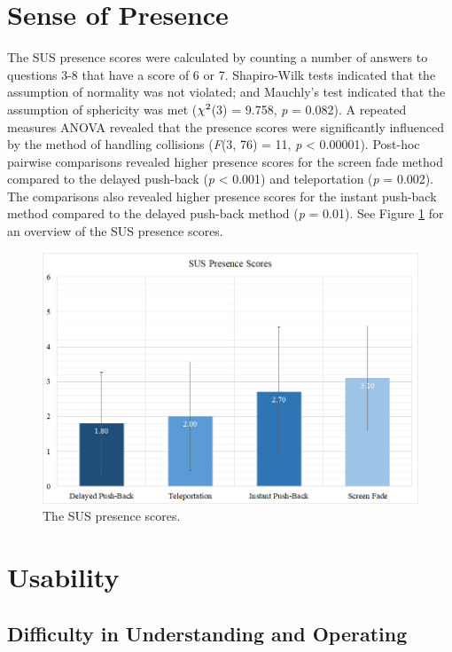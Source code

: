 \section{Sense of Presence}

The SUS presence scores were calculated by counting a number of answers to questions 3-8 that have a score of 6 or 7. Shapiro-Wilk tests
indicated that the assumption of normality was not violated; and Mauchly's test indicated that the assumption of sphericity was met (\textit{$\chi\textsuperscript{2}$}(3) = 9.758, \textit{p} = 0.082). A repeated measures ANOVA revealed that the presence scores were significantly influenced by the method of handling collisions (\textit{F}(3, 76) = 11, \textit{p} < 0.00001). Post-hoc pairwise comparisons revealed higher presence scores for the screen fade method compared to the delayed push-back (\textit{p} < 0.001) and teleportation (\textit{p} = 0.002). The comparisons also revealed higher presence scores for the instant push-back method compared to the delayed push-back method (\textit{p} = 0.01). See Figure \ref{fig:presence_scores} for an overview of the SUS presence scores.

\begin{figure}[th]
\centering
\includegraphics[width=1\textwidth]{img/presence_scores.png}
\caption{The SUS presence scores.}
\label{fig:presence_scores}
\end{figure}

\section{Usability}

\subsection{Difficulty in Understanding and Operating}

